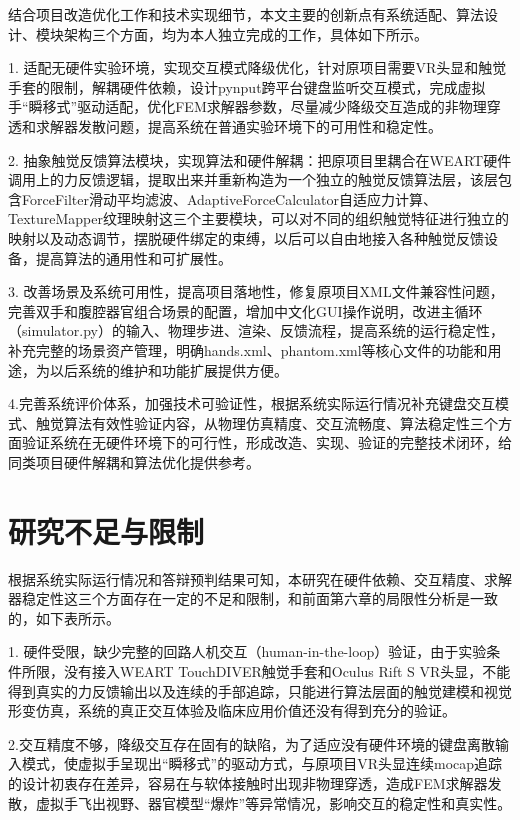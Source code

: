 结合项目改造优化工作和技术实现细节，本文主要的创新点有系统适配、算法设计、模块架构三个方面，均为本人独立完成的工作，具体如下所示。

1.
适配无硬件实验环境，实现交互模式降级优化，针对原项目需要VR头显和触觉手套的限制，解耦硬件依赖，设计pynput跨平台键盘监听交互模式，完成虚拟手``瞬移式''驱动适配，优化FEM求解器参数，尽量减少降级交互造成的非物理穿透和求解器发散问题，提高系统在普通实验环境下的可用性和稳定性。

2.
抽象触觉反馈算法模块，实现算法和硬件解耦：把原项目里耦合在WEART硬件调用上的力反馈逻辑，提取出来并重新构造为一个独立的触觉反馈算法层，该层包含ForceFilter滑动平均滤波、AdaptiveForceCalculator自适应力计算、TextureMapper纹理映射这三个主要模块，可以对不同的组织触觉特征进行独立的映射以及动态调节，摆脱硬件绑定的束缚，以后可以自由地接入各种触觉反馈设备，提高算法的通用性和可扩展性。

3.
改善场景及系统可用性，提高项目落地性，修复原项目XML文件兼容性问题，完善双手和腹腔器官组合场景的配置，增加中文化GUI操作说明，改进主循环（simulator.py）的输入、物理步进、渲染、反馈流程，提高系统的运行稳定性，补充完整的场景资产管理，明确hands.xml、phantom.xml等核心文件的功能和用途，为以后系统的维护和功能扩展提供方便。

4.完善系统评价体系，加强技术可验证性，根据系统实际运行情况补充键盘交互模式、触觉算法有效性验证内容，从物理仿真精度、交互流畅度、算法稳定性三个方面验证系统在无硬件环境下的可行性，形成改造、实现、验证的完整技术闭环，给同类项目硬件解耦和算法优化提供参考。

\section{研究不足与限制}

根据系统实际运行情况和答辩预判结果可知，本研究在硬件依赖、交互精度、求解器稳定性这三个方面存在一定的不足和限制，和前面第六章的局限性分析是一致的，如下表所示。

1.
硬件受限，缺少完整的回路人机交互（human-in-the-loop）验证，由于实验条件所限，没有接入WEART
TouchDIVER触觉手套和Oculus Rift S
VR头显，不能得到真实的力反馈输出以及连续的手部追踪，只能进行算法层面的触觉建模和视觉形变仿真，系统的真正交互体验及临床应用价值还没有得到充分的验证。

2.交互精度不够，降级交互存在固有的缺陷，为了适应没有硬件环境的键盘离散输入模式，使虚拟手呈现出``瞬移式''的驱动方式，与原项目VR头显连续mocap追踪的设计初衷存在差异，容易在与软体接触时出现非物理穿透，造成FEM求解器发散，虚拟手飞出视野、器官模型``爆炸''等异常情况，影响交互的稳定性和真实性。

